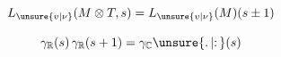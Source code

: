 \[
L_{\unsure{v|\nu}}(M\otimes T,s)=L_{\unsure{v|\nu}}(M)(s\pm1)
\]

\[
\gamma_{\mathbb{R}}(s)\,\gamma_{\mathbb{R}}(s+1)
=\gamma_{\mathbb{C}}\unsure{\mathpunct{.}|\mathpunct{:}}(s)
\]
\clearpage
